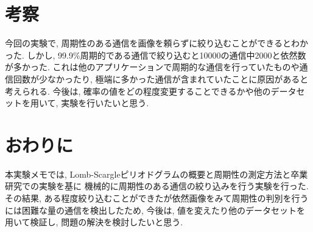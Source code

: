\documentclass[twocolumn,10pt]{ltjsarticle}
\begin{document}
\section{考察}
今回の実験で, 周期性のある通信を画像を頼らずに絞り込むことができるとわかった. 
しかし, 99.9\%周期的である通信で絞り込むと10000の通信中2000と依然数が多かった. 
これは他のアプリケーションで周期的な通信を行っていたものや通信回数が少なかったり, 
極端に多かった通信が含まれていたことに原因があると考えられる. 
今後は, 確率の値をどの程度変更することできるかや他のデータセットを用いて, 実験を行いたいと思う. 

\section{おわりに}
本実験メモでは, Lomb-Scargleピリオドグラムの概要と周期性の測定方法と卒業研究での実験を基に
機械的に周期性のある通信の絞り込みを行う実験を行った. 
その結果, ある程度絞り込むことができたが依然画像をみて周期性の判別を行うには困難な量の通信を検出したため, 
今後は, 値を変えたり他のデータセットを用いて検証し, 問題の解決を検討したいと思う. 



\end{document}
